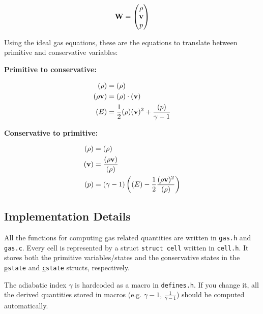 \begin{align}
	\mathbf{W} = 
		\begin{pmatrix}
			\rho \\ \mathbf{v} \\ p
		\end{pmatrix}
\end{align}



Using the ideal gas equations, these are the equations to translate between primitive and conservative variables:

\textbf{Primitive to conservative:}

\begin{align}
	(\rho) &= (\rho) \\
	(\rho \mathbf{v}) &= (\rho) \cdot (\mathbf{v}) \\
	(E) &= \frac{1}{2} (\rho) (\mathbf{v})^2 + \frac{(p)}{\gamma - 1} 
\end{align}


\textbf{Conservative to primitive:}

\begin{align}
	(\rho) &= (\rho) \\
	(\mathbf{v}) &= \frac{(\rho \mathbf{v} )}{(\rho)}\\
	(p) &= (\gamma - 1)  \left((E) - \frac{1}{2} \frac{(\rho \mathbf{v})^2}{(\rho)} \right) 
\end{align}













\subsection{Implementation Details}



All the functions for computing gas related quantities are written in \verb|gas.h| and \verb|gas.c|.
Every cell is represented by a struct \verb|struct cell| written in \verb|cell.h|.
It stores both the \underline{p}rimitive variables/states and the \underline{c}onservative states in the \texttt{\underline{p}state} and \texttt{\underline{c}state} structs, respectively.

The adiabatic index $\gamma$ is hardcoded as a macro in \texttt{defines.h}.
If you change it, all the derived quantities stored in macros (e.g. $\gamma - 1$, $\frac{1}{\gamma - 1}$) should be computed automatically.

